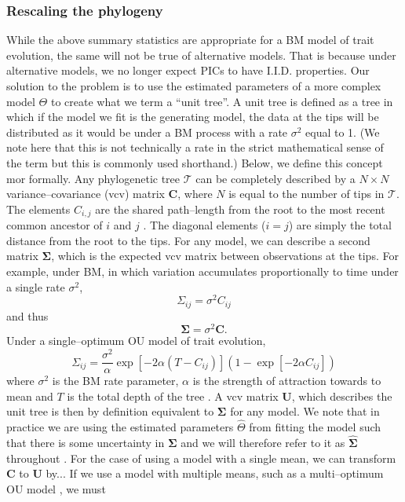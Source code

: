 \documentclass[12pt]{article}
\begin{document}
\subsubsection{Rescaling the phylogeny}

While the above summary statistics are appropriate for a BM model of trait evolution, the same will not be true of alternative models. That is because under alternative models, we no longer expect PICs to have I.I.D. properties. Our solution to the problem is to use the estimated parameters of a more complex model $\Theta$ to create what we term a ``unit tree''. A unit tree is defined as a tree in which if the model we fit is the generating model, the data at the tips will be distributed as it would be under a BM process with a rate $\sigma^2$ equal to 1. (We note here that this is not technically a rate in the strict mathematical sense of the term \citep{Bookstein1987} but this is commonly used shorthand.)  Below, we define this concept mor formally. Any phylogenetic tree $\mathcal{T}$ can be completely described by a $N \times N$ variance--covariance (vcv) matrix $\mathbf{C}$, where $N$ is equal to the number of tips in $\mathcal{T}$. The elements $C_{i,j}$ are the shared path--length from the root to the most recent common ancestor of $i$ and $j$ \citep{Piazza1975}. The diagonal elements ($i = j$) are simply the total distance from the root to the tips. For any model, we can describe a second matrix $\mathbf{\Sigma}$, which is the expected vcv matrix between observations at the tips. For example, under BM, in which variation accumulates proportionally to time under a single rate $\sigma^2$, 
\begin{equation}
\Sigma_{ij} = \sigma^2 C_{ij}
\end{equation}
and thus
\begin{equation}
\mathbf{\Sigma} = \sigma^2 \mathbf{C}.
\end{equation}
Under a single--optimum OU model of trait evolution, 
\begin{equation}
\Sigma_{ij} = \frac{\sigma^2}{\alpha} \exp[-2\alpha (T-C_{ij})] (1- \exp[-2\alpha C_{ij}])
\end{equation}
where $\sigma^2$ is the BM rate parameter, $\alpha$ is the strength of attraction towards to mean and $T$ is the total depth of the tree \citep{Hansen1997, ButlerKing2004}. A vcv matrix $\mathbf{U}$, which describes the unit tree is then by definition equivalent to $\mathbf{\Sigma}$ for any model. We note that in practice we are using the estimated parameters $\hat{\Theta}$ from fitting the model such that there is some uncertainty in $\mathbf{\Sigma}$ and we will therefore refer to it as $\hat{\mathbf{\Sigma}}$ throughout \citep{Rohlf2001, Blomberg2012}. For the case of using a model with a single mean, we can transform $\mathbf{C}$ to $\mathbf{U}$ by... If we use a model with multiple means, such as a multi--optimum OU model \citep{ButlerKing2004, Beaulieu2012}, we must 
\end{document}
